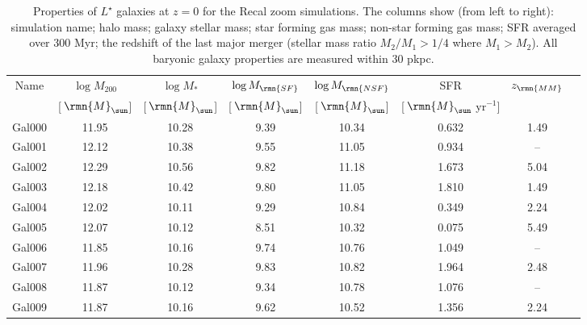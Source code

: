 \documentclass[fleqn,usenatbib]{mnras}
\newcommand\Msun{\,\rmn{M}_{\sun}}
\begin{document}
\begin{table*}
\caption{Properties of $L^\star$ galaxies at $z=0$ for the Recal zoom simulations. The columns show (from left to right): simulation name; halo mass; galaxy stellar mass; star forming gas mass; non-star forming gas mass; SFR averaged over 300 Myr; the redshift of the last major merger (stellar mass ratio $M_2/M_1 > 1/4$ where $M_1>M_2$). All baryonic galaxy properties are measured within 30 pkpc.}
\label{tab:sims}
\begin{tabular} {@{}cccccccc@{}}
  \hline
  Name & $\log M_{200}$ & $\log M_*$ & $\log M_\rmn{SF}$ & $\log M_\rmn{NSF}$ & SFR                 & $z_\rmn{MM}$ \\ 
       & [$\Msun$]      & [$\Msun$]  & [$\Msun$]         & [$\Msun$]          & [$\Msun$ yr$^{-1}$] &              \\ 
  \hline
  Gal000 & 11.95 & 10.28 & 9.39 & 10.34 & 0.632 & 1.49 \\
  Gal001 & 12.12 & 10.38 & 9.55 & 11.05 & 0.934 & --   \\ 
  Gal002 & 12.29 & 10.56 & 9.82 & 11.18 & 1.673 & 5.04 \\ 
  Gal003 & 12.18 & 10.42 & 9.80 & 11.05 & 1.810 & 1.49 \\ 
  Gal004 & 12.02 & 10.11 & 9.29 & 10.84 & 0.349 & 2.24 \\ 
  Gal005 & 12.07 & 10.12 & 8.51 & 10.32 & 0.075 & 5.49 \\ 
  Gal006 & 11.85 & 10.16 & 9.74 & 10.76 & 1.049 & --   \\ 
  Gal007 & 11.96 & 10.28 & 9.83 & 10.82 & 1.964 & 2.48 \\ 
  Gal008 & 11.87 & 10.12 & 9.34 & 10.78 & 1.076 & --   \\ 
  Gal009 & 11.87 & 10.16 & 9.62 & 10.52 & 1.356 & 2.24 \\ 
  \hline
\end{tabular}
\end{table*}
\end{document}
